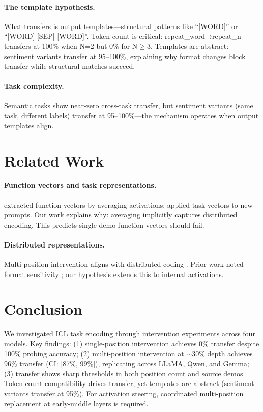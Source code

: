 \documentclass{article}
\begin{document}
\paragraph{The template hypothesis.}
What transfers is output templates---structural patterns like ``[WORD]'' or ``[WORD] [SEP] [WORD]''. Token-count is critical: repeat\_word→repeat\_n transfers at 100\% when N=2 but 0\% for N$\geq$3. Templates are abstract: sentiment variants transfer at 95--100\%, explaining why format changes block transfer while structural matches succeed.

\paragraph{Task complexity.}
Semantic tasks show near-zero cross-task transfer, but sentiment variants (same task, different labels) transfer at 95--100\%---the mechanism operates when output templates align.

\section{Related Work}
\label{sec:related}

\paragraph{Function vectors and task representations.}
\citet{todd2023function} extracted function vectors by averaging activations; \citet{hendel2023context} applied task vectors to new prompts. Our work explains why: averaging implicitly captures distributed encoding. This predicts single-demo function vectors should fail.

\paragraph{Distributed representations.}
Multi-position intervention aligns with distributed coding \citep{hinton1986distributed,elhage2022superposition}. Prior work noted format sensitivity \citep{lu2022fantastically,zhao2021calibrate}; our hypothesis extends this to internal activations.

\section{Conclusion}
\label{sec:conclusion}

We investigated ICL task encoding through intervention experiments across four models. Key findings: (1) single-position intervention achieves 0\% transfer despite 100\% probing accuracy; (2) multi-position intervention at $\sim$30\% depth achieves 96\% transfer (CI: [87\%, 99\%]), replicating across LLaMA, Qwen, and Gemma; (3) transfer shows sharp thresholds in both position count and source demos. Token-count compatibility drives transfer, yet templates are abstract (sentiment variants transfer at 95\%). For activation steering, coordinated multi-position replacement at early-middle layers is required.
\end{document}
